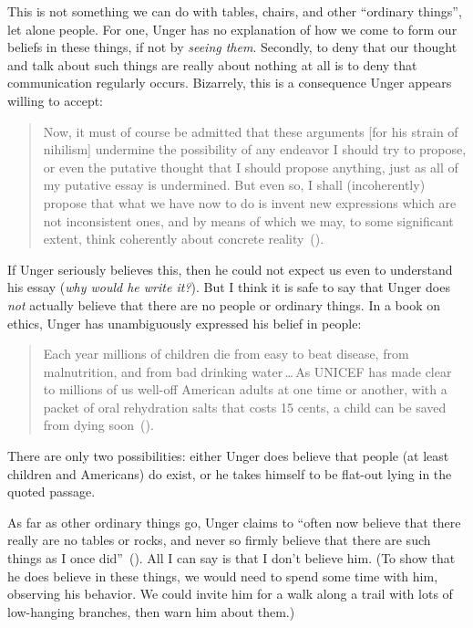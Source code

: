 \documentclass[11pt]{standalone} \newif\ifstandlone \standalonetrue
\newenvironment{squote}{%
	\begin{quote}\begin{singlespace}%
	}{%
	\end{singlespace}\end{quote}}
\begin{document}
\begin{spacing}{1.5}
This is not something we can do with tables, chairs, and other
``ordinary things'', let alone people.  For one, Unger has no
explanation of how we come to form our beliefs in these things, if not
by {\em seeing them}.  Secondly, to deny that our thought and talk
about such things are really about nothing at all is to deny that
communication regularly occurs.  Bizarrely, this is a consequence
Unger appears willing to accept:
\begin{squote}
Now, it must of course be admitted that these arguments [for his
  strain of nihilism] undermine the possibility of any endeavor I
should try to propose, or even the putative thought that I should
propose anything, just as all of my putative essay is undermined.  But
even so, I shall (incoherently) propose that what we have now to do is
invent new expressions which are not inconsistent ones, and by means
of which we may, to some significant extent, think coherently about
concrete reality~(\citeyear[544]{unger1980b}).
\end{squote}
If Unger seriously believes this, then he could not expect us even to
understand his essay ({\em why would he write it?}).  But I think it
is safe to say that Unger does {\em not} actually believe that there
are no people or ordinary things.  In a book on ethics, Unger has
unambiguously expressed his belief in people:

\begin{squote}
Each year millions of children die from easy to beat disease, from
malnutrition, and from bad drinking water\,\ldots\,As UNICEF has made
clear to millions of us well-off American adults at one time or
another, with a packet of oral rehydration salts that costs 15 cents,
a child can be saved from dying soon~(\citeyear[3]{unger1996}).
\end{squote}
There are only two possibilities: either Unger does believe that
people (at least children and Americans) do exist, or he takes himself
to be flat-out lying in the quoted passage.

As far as other ordinary things go, Unger claims to ``often now
believe that there really are no tables or rocks, and never so firmly
believe that there are such things as I once
did''~(\citeyear[543]{unger1980b}).  All I can say is that I don't
believe him.  (To show that he does believe in these things, we would
need to spend some time with him, observing his behavior.  We could
invite him for a walk along a trail with lots of low-hanging branches,
then warn him about them.)


\end{spacing}
\end{document}
